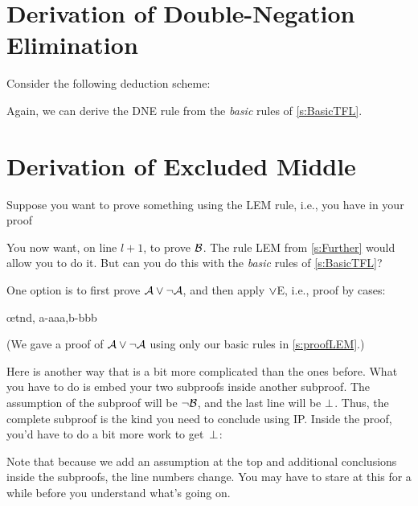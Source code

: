 \section{Derivation of Double-Negation Elimination}
Consider the following deduction scheme:
	\begin{fitchproof}
	\open
		\AS
	\close
\end{fitchproof}
Again,  we can derive the DNE rule from the \emph{basic} rules of \cref{s:BasicTFL}.

\section{Derivation of Excluded Middle}
Suppose you want to prove something using the LEM rule, i.e., you have in your proof
\begin{fitchproof}
  \open
  \AS
  \close
  \open
  \AS
  \close
\end{fitchproof}
You now want, on line $l+1$, to prove $\mathcal{B}$. The rule LEM from
\cref{s:Further} would allow you to do it. But can you do this with
the \emph{basic} rules of \cref{s:BasicTFL}?

One option is to first prove $\mathcal{A} \vee \neg\mathcal{A}$, and then apply $\vee$E, i.e., proof by cases:
\begin{fitchproof}
  \open
  \AS
  \close
  \open
  \AS
  \close
  \ellipsesline
  \oe{tnd, a-aaa,b-bbb}
\end{fitchproof}
(We gave a proof of $\mathcal{A} \vee \neg\mathcal{A}$ using only our basic rules in \cref{s:proofLEM}.)

Here is another way that is a bit more complicated than the ones before. What you have to do is embed your two subproofs inside another subproof. The assumption of the subproof will be $\neg \mathcal{B}$, and the last line will be $\bot$. Thus, the complete subproof is the kind you need to conclude  using IP. Inside the proof, you'd have to do a bit more work to get~$\bot$:
\begin{fitchproof}
  \open
  \AS
  \open
  \AS
  \ellipsesline
  \close
  \open
  \AS
  \ellipsesline
  \close
  \close
\end{fitchproof}
Note that because we add an assumption at the top and additional conclusions inside the subproofs, the line numbers change. You may have to stare at this for a while before you understand what's going on.


